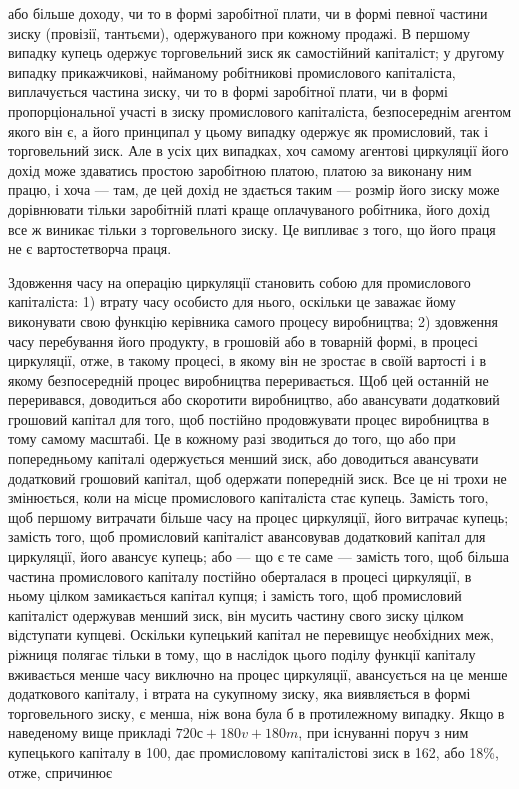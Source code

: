 \parcont{}  %
або більше доходу, чи то в формі заробітної плати, чи в формі
певної частини зиску (провізії, тантьєми), одержуваного при
кожному продажі. В першому випадку купець одержує торговельний
зиск як самостійний капіталіст; у другому випадку прикажчикові,
найманому робітникові промислового капіталіста, виплачується
частина зиску, чи то в формі заробітної плати, чи
в формі пропорціональної участі в зиску промислового капіталіста,
безпосереднім агентом якого він є, а його принципал
у цьому випадку одержує як промисловий, так і торговельний
зиск. Але в усіх цих випадках, хоч самому агентові циркуляції
його дохід може здаватись простою заробітною платою, платою
за виконану ним працю, і хоча — там, де цей дохід не здається
таким — розмір його зиску може дорівнювати тільки заробітній
платі краще оплачуваного робітника, його дохід все ж виникає
тільки з торговельного зиску. Це випливає з того, що його
праця не є вартостетворча праця.

Здовження часу на операцію циркуляції становить собою
для промислового капіталіста: 1) втрату часу особисто для нього,
оскільки це заважає йому виконувати свою функцію керівника
самого процесу виробництва; 2) здовження часу перебування
його продукту, в грошовій або в товарній формі, в процесі циркуляції,
отже, в такому процесі, в якому він не зростає в своїй
вартості і в якому безпосередній процес виробництва переривається.
Щоб цей останній не переривався, доводиться або
скоротити виробництво, або авансувати додатковий грошовий
капітал для того, щоб постійно продовжувати процес виробництва
в тому самому масштабі. Це в кожному разі зводиться
до того, що або при попередньому капіталі одержується менший
зиск, або доводиться авансувати додатковий грошовий
капітал, щоб одержати попередній зиск. Все це ні трохи не
змінюється, коли на місце промислового капіталіста стає купець.
Замість того, щоб першому витрачати більше часу на процес
циркуляції, його витрачає купець; замість того, щоб промисловий
капіталіст авансовував додатковий капітал для циркуляції,
його авансує купець; або — що є те саме — замість того,
щоб більша частина промислового капіталу постійно оберталася
в процесі циркуляції, в ньому цілком замикається капітал
купця; і замість того, щоб промисловий капіталіст одержував
менший зиск, він мусить частину свого зиску цілком відступати
купцеві. Оскільки купецький капітал не перевищує необхідних
меж, ріжниця полягає тільки в тому, що в наслідок
цього поділу функції капіталу вживається менше часу виключно
на процес циркуляції, авансується на це менше додаткового
капіталу, і втрата на сукупному зиску, яка виявляється в формі
торговельного зиску, є менша, ніж вона була б в протилежному
випадку. Якщо в наведеному вище прикладі $720с + 180v + 180m$,
при існуванні поруч з ним купецького капіталу в 100, дає промисловому
капіталістові зиск в 162, або 18\%, отже, спричинює
\parbreak{}  %
